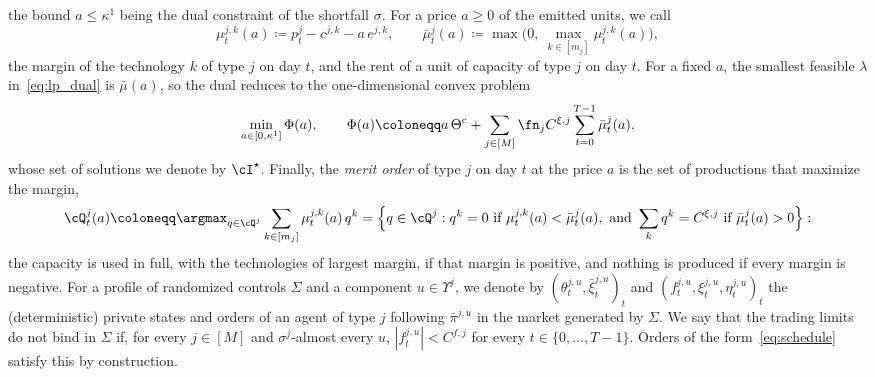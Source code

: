     the bound $a \le \kappa^1$ being the dual constraint of the shortfall $\sigma$. For a price $a \ge 0$ of the emitted units, we call
    $$
        \mu^{j,k}_t(a) \coloneqq p^j_t - c^{j,k} - a\, e^{j,k}, \qquad \bar\mu^j_t(a) \coloneqq \max\Big(0,\ \max_{k \in [m_j]} \mu^{j,k}_t(a)\Big),
    $$
    the margin of the technology $k$ of type $j$ on day $t$, and the rent of a unit of capacity of type $j$ on day $t$. For a fixed $a$, the smallest feasible $\lambda$ in~\eqref{eq:lp_dual} is $\bar\mu(a)$, so the dual reduces to the one-dimensional convex problem
    \begin{equation}
        \label{eq:lp_phi}
        \min_{a \in [0, \kappa^1]} \Phi(a), \qquad \Phi(a) \coloneqq a\, \Theta^{\mathrm c} + \sum_{j \in [M]} \fn_j C^{\xi,j} \sum_{t=0}^{T-1} \bar\mu^j_t(a),
    \end{equation}
    whose set of solutions we denote by $\cI^\star$. Finally, the \emph{merit order} of type $j$ on day $t$ at the price $a$ is the set of productions that maximize the margin,
    $$
        \cQ^j_t(a) \coloneqq \argmax_{q \in \cQ^j} \sum_{k \in [m_j]} \mu^{j,k}_t(a)\, q^k = \Big\{ q \in \cQ^j : q^k = 0 \text{ if } \mu^{j,k}_t(a) < \bar\mu^j_t(a), \ \text{and} \ \sum_{k} q^k = C^{\xi,j} \text{ if } \bar\mu^j_t(a) > 0 \Big\}:
    $$
    the capacity is used in full, with the technologies of largest margin, if that margin is positive, and nothing is produced if every margin is negative. For a profile of randomized controls $\Sigma$ and a component $u \in \Upsilon^j$, we denote by $(\theta^{j,u}_t, \bar\xi^{j,u}_t)_t$ and $(f^{j,u}_t, \xi^{j,u}_t, \eta^{j,u}_t)_t$ the (deterministic) private states and orders of an agent of type $j$ following $\bar\pi^{j,u}$ in the market generated by $\Sigma$. We say that the trading limits do not bind in $\Sigma$ if, for every $j \in [M]$ and $\sigma^j$-almost every $u$, $|f^{j,u}_t| < C^{f,j}$ for every $t \in \{0, \dots, T-1\}$. Orders of the form~\eqref{eq:schedule} satisfy this by construction.

